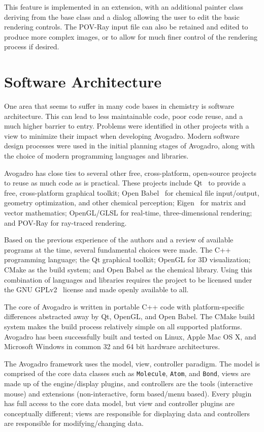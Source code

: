 \documentclass[10pt]{bmc_article}
\newenvironment{bmcformat}{\begin{raggedright}
  \baselineskip20pt\sloppy\setboolean{publ}{false}}{\end{raggedright}
  \baselineskip20pt\sloppy}
\begin{document}
\begin{bmcformat}
This feature is implemented in an extension, with an additional painter class
deriving from the base class and a dialog allowing the user to edit the basic
rendering controls. The POV-Ray input file can also be retained and edited to
produce more complex images, or to allow for much finer control of the
rendering process if desired.

\section*{Software Architecture}

One area that seems to suffer in many code bases in chemistry is software
architecture. This can lead to less maintainable code, poor code reuse, and a
much higher barrier to entry. Problems were identified in other projects with a
view to minimize their impact when developing Avogadro. Modern software design
processes were used in the initial planning stages of Avogadro, along with the
choice of modern programming languages and libraries.

Avogadro has close ties to several other free, cross-platform, open-source
projects to reuse as much code as is practical. These projects include
Qt~\cite{Qt} to provide a free, cross-platform graphical toolkit; Open
Babel~\cite{OpenBabel} for chemical file input/output, geometry optimization, and
other chemical perception; Eigen~\cite{Eigen} for matrix and vector mathematics;
OpenGL/GLSL for real-time, three-dimensional rendering; and POV-Ray for ray-traced
rendering.

Based on the previous experience of the authors and a review of
available programs at the time, several fundamental choices were made.
The C++ programming language; the Qt graphical toolkit;
OpenGL for 3D visualization; CMake as the build system; and Open Babel as
the chemical library. Using this combination of languages and
libraries requires the project to be licensed under the GNU GPLv2~\cite{GPLv2}
license and made openly available to all.

The core of Avogadro is written in portable C++ code with platform-specific
differences abstracted away by Qt, OpenGL, and Open Babel. The CMake build system
makes the build process relatively simple on all supported platforms. Avogadro
has been successfully built and tested on Linux, Apple Mac OS X, and Microsoft
Windows in common 32 and 64 bit hardware architectures.

The Avogadro framework uses the model, view, controller paradigm. The model
is comprised of the core data classes such as {\tt Molecule}, {\tt Atom}, and
{\tt Bond}, views are made up of the engine/display plugins, and
controllers are the tools (interactive mouse) and extensions
(non-interactive, form based/menu based). Every plugin has full access
to the core data model, but view and controller plugins are
conceptually different; views are responsible for displaying
data and controllers are responsible for modifying/changing data.


\end{bmcformat}
\end{document}
